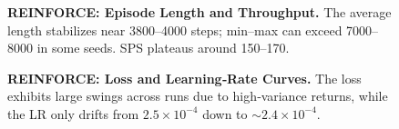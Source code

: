 \begin{figure}[htbp]
	\centering
	\quad
	\caption{\textbf{REINFORCE: Episode Length and Throughput.} 
		The average length stabilizes near 3800–4000 steps; 
		min–max can exceed 7000–8000 in some seeds. 
		SPS plateaus around 150–170.}
	\label{fig:reinforce_trainmetrics1}
\end{figure}

\begin{figure}[htbp]
	\centering
	\quad
	\caption{\textbf{REINFORCE: Loss and Learning‐Rate Curves.} 
		The loss exhibits large swings across runs due to high‐variance returns, 
		while the LR only drifts from $2.5\times10^{-4}$ down to $\sim2.4\times10^{-4}$.}
	\label{fig:reinforce_trainmetrics2}
\end{figure}


